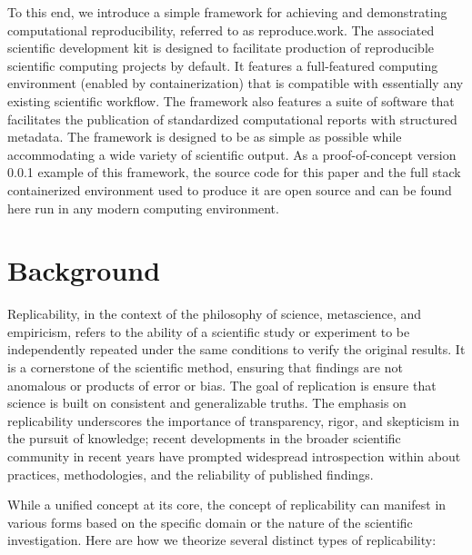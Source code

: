 To this end, we introduce a simple framework for achieving and demonstrating computational reproducibility, referred to as reproduce.work. The associated scientific development kit is designed to facilitate production of reproducible scientific computing projects by default. It features a full-featured computing environment (enabled by containerization) that is compatible with essentially any existing scientific workflow. The framework also features a suite of software that facilitates the publication of standardized computational reports with structured metadata. The framework is designed to be as simple as possible while accommodating a wide variety of scientific output. As a proof-of-concept version 0.0.1 example of this framework, the source code for this paper and the full stack containerized environment used to produce it are open source and can be found here run in any modern computing environment. 

\hypertarget{background}{%
\section{Background}\label{background}}

Replicability, in the context of the philosophy of science, metascience, and empiricism, refers to the ability of a scientific study or experiment to be independently repeated under the same conditions to verify the original results. It is a cornerstone of the scientific method, ensuring that findings are not anomalous or products of error or bias. The goal of replication is ensure that science is built on consistent and generalizable truths. The emphasis on replicability underscores the importance of transparency, rigor, and skepticism in the pursuit of knowledge; recent developments in the broader scientific community in recent years have prompted widespread introspection within about practices, methodologies, and the reliability of published findings.

While a unified concept at its core, the concept of replicability can manifest in various forms based on the specific domain or the nature of the scientific investigation. Here are how we theorize several distinct types of replicability:

